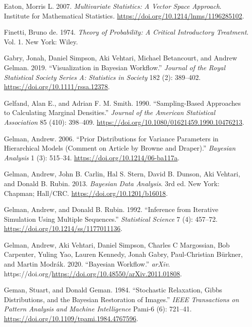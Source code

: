 \documentclass[
  11pt,
  letterpaper,
]{scrbook}
\newlength{\cslhangindent}
\newenvironment{CSLReferences}[2] %
 {\begin{list}{}{%
  \setlength{\itemindent}{0pt}
  \setlength{\leftmargin}{0pt}
  \setlength{\parsep}{0pt}
  \ifodd #1
   \setlength{\leftmargin}{\cslhangindent}
   \setlength{\itemindent}{-1\cslhangindent}
  \fi
  \setlength{\itemsep}{#2\baselineskip}}}
 {\end{list}}
\theoremstyle{definition}
\theoremstyle{definition}
\theoremstyle{definition}
\theoremstyle{plain}
\theoremstyle{plain}
\theoremstyle{plain}
\theoremstyle{remark}
\begin{document}
\begin{CSLReferences}{1}{0}
Eaton, Morris L. 2007. \emph{Multivariate Statistics: A Vector Space
Approach}. Institute for Mathematical Statistics.
\url{https://doi.org/10.1214/lnms/1196285102}.

Finetti, Bruno de. 1974. \emph{Theory of Probability: A Critical
Introductory Treatment}. Vol. 1. New York: Wiley.

Gabry, Jonah, Daniel Simpson, Aki Vehtari, Michael Betancourt, and
Andrew Gelman. 2019. {``{Visualization in {B}ayesian Workflow}.''}
\emph{Journal of the Royal Statistical Society Series A: Statistics in
Society} 182 (2): 389--402. \url{https://doi.org/10.1111/rssa.12378}.

Gelfand, Alan E., and Adrian F. M. Smith. 1990. {``Sampling-Based
Approaches to Calculating Marginal Densities.''} \emph{Journal of the
American Statistical Association} 85 (410): 398--409.
\url{https://doi.org/10.1080/01621459.1990.10476213}.

Gelman, Andrew. 2006. {``Prior Distributions for Variance Parameters in
Hierarchical Models (Comment on Article by {B}rowne and {D}raper).''}
\emph{Bayesian Analysis} 1 (3): 515--34.
\url{https://doi.org/10.1214/06-ba117a}.

Gelman, Andrew, John B. Carlin, Hal S. Stern, David B. Dunson, Aki
Vehtari, and Donald B. Rubin. 2013. \emph{Bayesian Data Analysis}. 3rd
ed. New York: Chapman; Hall/CRC. \url{https://doi.org/10.1201/b16018}.

Gelman, Andrew, and Donald B. Rubin. 1992. {``Inference from Iterative
Simulation Using Multiple Sequences.''} \emph{Statistical Science} 7
(4): 457--72. \url{https://doi.org/10.1214/ss/1177011136}.

Gelman, Andrew, Aki Vehtari, Daniel Simpson, Charles C Margossian, Bob
Carpenter, Yuling Yao, Lauren Kennedy, Jonah Gabry, Paul-Christian
Bürkner, and Martin Modrák. 2020. {``Bayesian Workflow.''} \emph{arXiv}.
https://doi.org/\url{https://doi.org/10.48550/arXiv.2011.01808}.

Geman, Stuart, and Donald Geman. 1984. {``Stochastic Relaxation, {G}ibbs
Distributions, and the {B}ayesian Restoration of Images.''} \emph{IEEE
Transactions on Pattern Analysis and Machine Intelligence} Pami-6 (6):
721--41. \url{https://doi.org/10.1109/tpami.1984.4767596}.


\end{CSLReferences}
\end{document}
